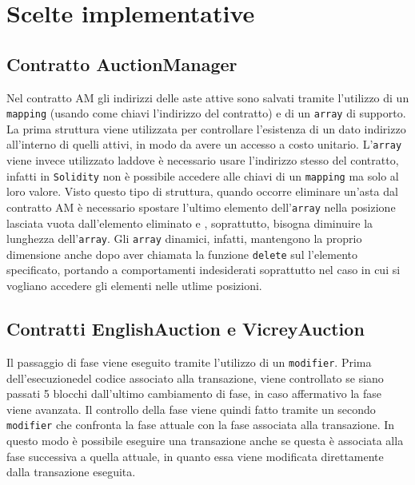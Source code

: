 \section{Scelte implementative}
\subsection{Contratto AuctionManager}
Nel contratto AM gli indirizzi delle aste attive sono salvati tramite l'utilizzo di un \texttt{mapping} (usando come chiavi l'indirizzo del contratto) e di un \texttt{array} di supporto. La prima struttura viene utilizzata per controllare l'esistenza di un dato indirizzo all'interno di quelli attivi, in modo da avere un accesso a costo unitario. L'\texttt{array} viene invece utilizzato laddove è necessario usare l'indirizzo stesso del contratto, infatti in \texttt{Solidity} non è possibile accedere alle chiavi di un \texttt{mapping} ma solo al loro valore. Visto questo tipo di struttura, quando occorre eliminare un'asta dal contratto AM è necessario spostare l'ultimo elemento dell'\texttt{array} nella posizione lasciata vuota dall'elemento eliminato e , soprattutto, bisogna diminuire la lunghezza dell'\texttt{array}. Gli \texttt{array} dinamici, infatti, mantengono la proprio dimensione anche dopo aver chiamata la funzione \texttt{delete} sul l'elemento specificato, portando a comportamenti indesiderati soprattutto nel caso in cui si vogliano accedere gli elementi nelle utlime posizioni.\newline
\subsection{Contratti EnglishAuction e VicreyAuction}
Il passaggio di fase viene eseguito tramite l'utilizzo di un \texttt{modifier}. Prima dell'esecuzionedel codice associato alla transazione, viene controllato se siano passati 5 blocchi dall'ultimo cambiamento di fase, in caso affermativo la fase viene avanzata. Il controllo della fase viene quindi fatto tramite un secondo \texttt{modifier} che confronta la fase attuale con la fase associata alla transazione. In questo modo è possibile eseguire una transazione anche se questa è associata alla fase successiva a quella attuale, in quanto essa viene modificata direttamente dalla transazione eseguita.
